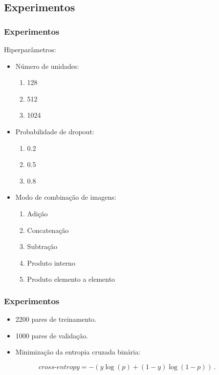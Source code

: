 \documentclass{beamer}
\begin{document}
\subsection{Experimentos}
\begin{frame}
\frametitle{Experimentos}
Hiperparâmetros:
\begin{itemize}
    \item Número de unidades:
        \begin{enumerate}
            \item 128
            \item 512
            \item 1024
        \end{enumerate}
    \item Probabilidade de dropout:
        \begin{enumerate}
            \item 0.2
            \item 0.5
            \item 0.8
        \end{enumerate}
    \item Modo de combinação de imagens:
        \begin{enumerate}
            \item Adição
            \item Concatenação
            \item Subtração
            \item Produto interno
            \item Produto elemento a elemento
        \end{enumerate}
\end{itemize}
\end{frame}
\begin{frame}
\frametitle{Experimentos}
\begin{itemize}
    \item 2200 pares de treinamento.
    \item 1000 pares de validação.
    \item Minimização da entropia cruzada binária:
\end{itemize}
    \begin{equation}
    \textit{cross-entropy} = -{(y\log(p) + (1 - y)\log(1 - p))}\,.
    \end{equation}
\end{frame}
\end{document}
